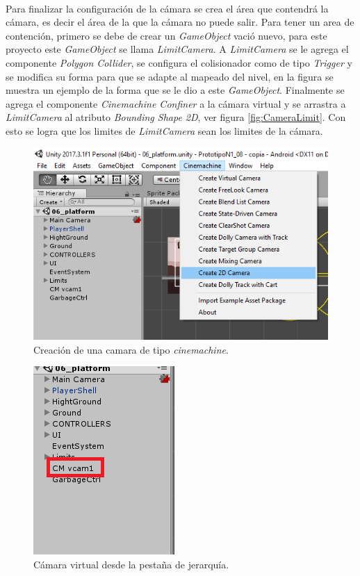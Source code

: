 \\
\par
Para finalizar la configuración de la cámara se crea el área que contendrá la cámara, 
es decir el área de la que la cámara no puede salir. Para tener un area de 
contención, primero se debe de crear un \textit{GameObject} vació nuevo, para 
este proyecto este \textit{GameObject} se llama \textit{LimitCamera}. A 
\textit{LimitCamera} se le agrega el componente \textit{Polygon Collider}, se 
configura el colisionador como de tipo \textit{Trigger} y se modifica su forma 
para que se adapte al mapeado del nivel, en la figura se muestra un ejemplo de la 
forma que se le dio a este \textit{GameObject}. Finalmente se agrega el componente 
\textit{Cinemachine Confiner} a la cámara virtual y se arrastra a 
\textit{LimitCamera} al atributo \textit{Bounding Shape 2D}, ver figura 
\ref{fig:CameraLimit}. Con esto se logra que los limites de \textit{LimitCamera} 
sean los limites de la cámara.

\begin{figure}[h]
		\centering
		\includegraphics[height=0.2 \textheight]{03TrabajoRealizado/imagenes/cinemachine0001.png}
		\caption{Creación de una camara de tipo \textit{cinemachine}.}
		\label{fig:CinemachineCreate}
\end{figure}

\begin{figure}[h]
		\centering
		\includegraphics[height=0.2 \textheight]{03TrabajoRealizado/imagenes/cinemachine0002.png}
		\caption{Cámara virtual desde la pestaña de jerarquía.}
		\label{fig:VitualCamera}
\end{figure}

